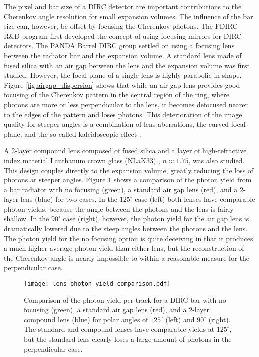 The pixel and bar size of a DIRC detector are important contributions to the Cherenkov angle resolution for small expansion volumes. The influence of the bar size can, however, be offset by focusing the Cherenkov photons. The FDIRC R\&D program first developed the concept of using focusing mirrors for DIRC detectors. The PANDA Barrel DIRC group settled on using a focusing lens between the radiator bar and the expansion volume. A standard lens made of fused silica with an air gap between the lens and the expansion volume was first studied. However, the focal plane of a single lens is highly parabolic in shape. Figure \ref{fig:airgap_dispersion} shows that while an air gap lens provides good focusing of the Cherenkov pattern in the central region of the ring, where photons are more or less perpendicular to the lens, it becomes defocused nearer to the edges of the pattern and loses photons. This deterioration of the image quality for steeper angles is a combination of lens aberrations, the curved focal plane, and the so-called kaleidoscopic effect \cite{FDIRCMathematica}.

A 2-layer compound lens composed of fused silica and a layer of high-refractive index material Lanthanum crown glass (NLaK33) \cite{SchottData}, $n \approx 1.75$, was also studied. This design couples directly to the expansion volume, greatly reducing the loss of photons at steeper angles. Figure \ref{fig:lens_photon_yield} shows a comparison of the photon yield from a bar radiator with no focusing (green), a standard air gap lens (red), and a 2-layer lens (blue) for two cases. In the $125^\circ$ case (left) both lenses have comparable photon yields, because the angle between the photons and the lens is fairly shallow. In the $90^\circ$ case (right), however, the photon yield for the air gap lens is dramatically lowered due to the steep angles between the photons and the lens. The photon yield for the no focusing option is quite deceiving in that it produces a much higher average photon yield than either lens, but the reconstruction of the Cherenkov angle is nearly impossible to within a reasonable measure for the perpendicular case.

\begin{figure}[!htb]
	\centering
	\texttt{[image: lens\_photon\_yield\_comparison.pdf]}
	\caption{Comparison of the photon yield per track for a DIRC bar with no focusing (green), a standard air gap lens (red), and a 2-layer compound lens (blue) for polar angles of $125^\circ$ (left) and $90^\circ$ (right). The standard and compound lenses have comparable yields at $125^\circ$, but the standard lens clearly loses a large amount of photons in the perpendicular case.}
	\label{fig:lens_photon_yield}
\end{figure}

